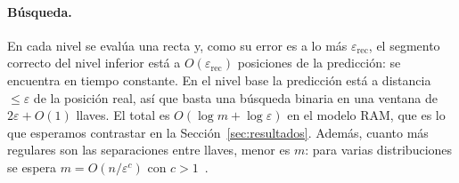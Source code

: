 \paragraph{Búsqueda.} En cada nivel se evalúa una recta y, como su error es a lo más
$\varepsilon_{\text{rec}}$, el segmento correcto del nivel inferior está a $O(\varepsilon_{\text{rec}})$
posiciones de la predicción: se encuentra en tiempo constante. En el nivel base la predicción
está a distancia $\le\varepsilon$ de la posición real, así que basta una búsqueda binaria en una
ventana de $2\varepsilon+O(1)$ llaves. El total es $O(\log m + \log\varepsilon)$ en el modelo
RAM, que es lo que esperamos contrastar en la Sección~\ref{sec:resultados}. Además, cuanto más
regulares son las separaciones entre llaves, menor es $m$: para varias distribuciones se espera
$m = O(n/\varepsilon^{c})$ con $c>1$~\cite{ferragina2020icml}.
